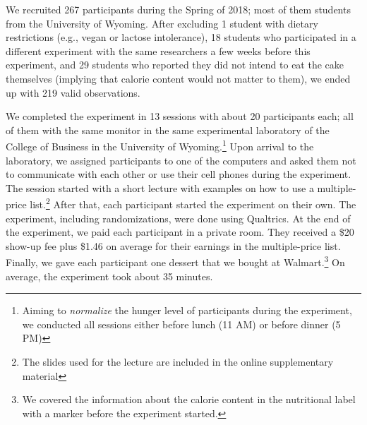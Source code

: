 We recruited 267 participants during the Spring of 2018; most of them students from the University of Wyoming. After excluding 1 student with dietary restrictions (e.g., vegan or lactose intolerance), 18 students who participated in a different experiment with the same researchers a few weeks before this experiment, and 29 students who reported they did not intend to eat the cake themselves (implying that calorie content would not matter to them), we ended up with 219 valid observations.

We completed the experiment in 13 sessions with about 20 participants each; all of them with the same monitor in the same experimental laboratory of the College of Business in the University of Wyoming.\footnote{Aiming to \emph{normalize} the hunger level of participants during the experiment, we conducted all sessions either before lunch (11 AM) or before dinner (5 PM)} Upon arrival to the laboratory, we assigned participants to one of the computers and asked them not to communicate with each other or use their cell phones during the experiment. The session started with a short lecture with examples on how to use a multiple-price list.\footnote{The slides used for the lecture are included in the online supplementary material} After that, each participant started the experiment on their own. The experiment, including randomizations, were done using Qualtrics. At the end of the experiment, we paid each participant in a private room. They received a \$20 show-up fee plus \$1.46 on average for their earnings in the multiple-price list. Finally, we gave each participant one dessert that we bought at Walmart.\footnote{We covered the information about the calorie content in the nutritional label with a marker before the experiment started.} On average, the experiment took about 35 minutes.
